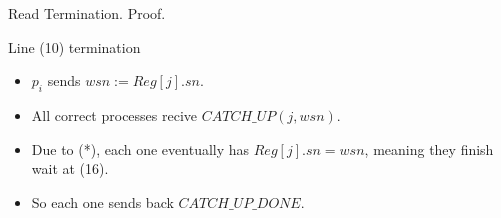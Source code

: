 \begin{frame}{Read Termination. Proof.}
    \begin{block}{Line (10) termination}
        \begin{itemize}
            \item $p_i$ sends $wsn:=Reg[j].sn$.
            \item All correct processes recive $CATCH\_UP(j,wsn)$.
            \item Due to (*), each one eventually has $Reg[j].sn = wsn$, meaning they finish wait at (16).
            \item So each one sends back $CATCH\_UP\_DONE$.
        \end{itemize}
    \end{block}
\end{frame}

